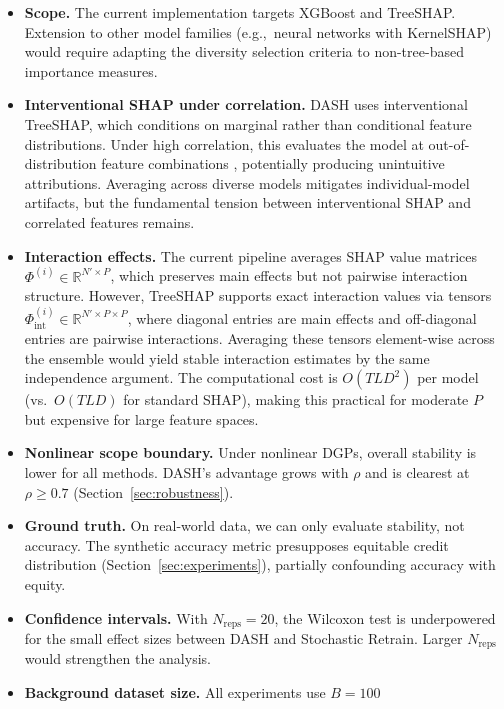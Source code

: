 \documentclass[11pt]{article}
\newcommand{\dash}{\textsc{DASH}}
\newcommand{\rhovar}{\rho}
\newcommand{\eg}{e.g.,\ }
\begin{document}
\begin{itemize}
  \item \textbf{Scope.} The current implementation targets XGBoost and
    TreeSHAP. Extension to other model families (\eg neural networks
    with KernelSHAP) would require adapting the diversity selection
    criteria to non-tree-based importance measures.
  \item \textbf{Interventional SHAP under correlation.} DASH uses
    interventional TreeSHAP, which conditions on marginal rather than
    conditional feature distributions. Under high correlation, this
    evaluates the model at out-of-distribution feature combinations
    \citep{janzing2020feature, aas2021explaining}, potentially
    producing unintuitive attributions. Averaging across diverse models
    mitigates individual-model artifacts, but the fundamental tension
    between interventional SHAP and correlated features remains.
  \item \textbf{Interaction effects.} The current pipeline averages SHAP
    value matrices $\Phi^{(i)} \in \mathbb{R}^{N' \times P}$, which
    preserves main effects but not pairwise interaction structure.
    However, TreeSHAP supports exact interaction values via tensors
    $\Phi_{\text{int}}^{(i)} \in \mathbb{R}^{N' \times P \times P}$,
    where diagonal entries are main effects and off-diagonal entries
    are pairwise interactions. Averaging these tensors element-wise
    across the ensemble would yield stable interaction estimates
    by the same independence argument. The computational cost is
    $O(TLD^2)$ per model (vs.\ $O(TLD)$ for standard SHAP), making
    this practical for moderate $P$ but expensive for large feature
    spaces.
  \item \textbf{Nonlinear scope boundary.} Under nonlinear DGPs,
    overall stability is lower for all methods. \dash{}'s advantage
    grows with $\rhovar$ and is clearest at $\rhovar \geq 0.7$
    (Section~\ref{sec:robustness}).
  \item \textbf{Ground truth.} On real-world data, we can only evaluate
    stability, not accuracy. The synthetic accuracy metric presupposes
    equitable credit distribution (Section~\ref{sec:experiments}),
    partially confounding accuracy with equity.
  \item \textbf{Confidence intervals.} With $N_{\text{reps}} = 20$, the
    Wilcoxon test is underpowered for the small effect sizes between
    \dash{} and Stochastic Retrain. Larger $N_{\text{reps}}$ would
    strengthen the analysis.
  \item \textbf{Background dataset size.} All experiments use $B = 100$

\end{itemize}
\end{document}
